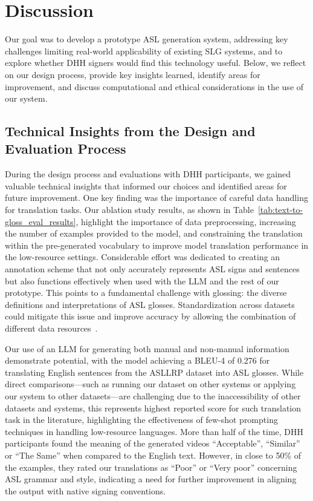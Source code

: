 \section{Discussion}\label{sec:discussion}

Our goal was to develop a prototype ASL generation system, addressing key challenges limiting real-world applicability of existing SLG systems, and to explore whether DHH signers would find this technology useful. Below, we reflect on our design process, provide key insights learned, identify areas for improvement, and discuss computational and ethical considerations in the use of our system.

\subsection{Technical Insights from the Design and Evaluation Process}

During the design process and evaluations with DHH participants, we gained valuable technical insights that informed our choices and identified areas for future improvement. One key finding was the importance of careful data handling for translation tasks. Our ablation study results, as shown in Table~\ref{tab:text-to-gloss_eval_results}, highlight the importance of data preprocessing, increasing the number of examples provided to the model, and constraining the translation within the pre-generated vocabulary to improve model translation performance in the low-resource settings. Considerable effort was dedicated to creating an annotation scheme that not only accurately represents ASL signs and sentences but also functions effectively when used with the LLM and the rest of our prototype. This points to a fundamental challenge with glossing: the diverse definitions and interpretations of ASL glosses. Standardization across datasets could mitigate this issue and improve accuracy by allowing the combination of different data resources~\cite{bragg_sign_2019}.

Our use of an LLM for generating both manual and non-manual information demonstrate potential, with the model achieving a BLEU-4 of 0.276 for translating English sentences from the ASLLRP dataset into ASL glosses. While direct comparisons---such as running our dataset on other systems or applying our system to other datasets---are challenging due to the inaccessibility of other datasets and systems, this represents highest reported score for such translation task in the literature, highlighting the effectiveness of few-shot prompting techniques in handling low-resource languages. More than half of the time, DHH participants found the meaning of the generated videos ``Acceptable'', ``Similar'' or ``The Same'' when compared to the English text. However,  in close to 50\% of the examples, they rated our translations as ``Poor'' or ``Very poor'' concerning ASL grammar and style, indicating a need for further improvement in aligning the output with native signing conventions. 

